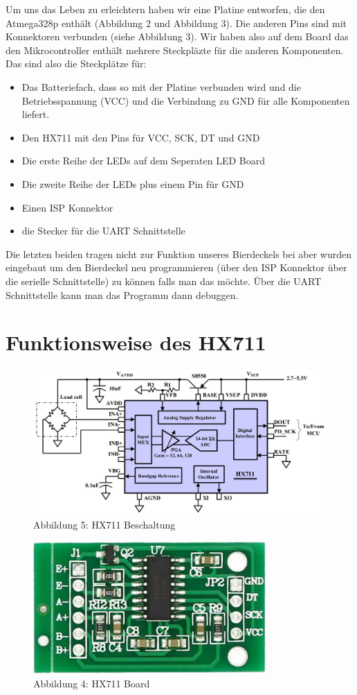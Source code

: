 \documentclass[12pt,journal,compsoc]{IEEEtran}
\begin{document}
Um uns das Leben zu erleichtern haben wir eine Platine entworfen, die den Atmega328p enthält
(Abbildung 2 und Abbildung 3). Die anderen Pins sind mit Konnektoren verbunden (siehe Abbildung 3).
Wir haben also auf dem Board das den Mikrocontroller enthält mehrere Steckpläzte für die anderen
Komponenten. Das sind also die Steckplätze für:
\begin{itemize}
 \item Das Batteriefach, dass so mit der Platine verbunden wird und die Betriebsspannung (VCC) und die Verbindung zu GND für alle Komponenten liefert.
 \item Den HX711 mit den Pins für VCC, SCK, DT und GND
 \item Die erste Reihe der LEDs auf dem Seperaten LED Board
 \item Die zweite Reihe der LEDs plus einem Pin für GND
 \item Einen ISP Konnektor
 \item die Stecker für die UART Schnittstelle
\end{itemize}

Die letzten beiden tragen nicht zur Funktion unseres Bierdeckels bei aber wurden eingebaut um den
Bierdeckel neu programmieren (über den ISP Konnektor über die serielle Schnittstelle) zu können
falls man das möchte. Über die UART Schnittstelle kann man das Programm dann debuggen.

\section{Funktionsweise des HX711}

\begin{figure}[!t]
\centering
\includegraphics[width=7in]{images/HX711.jpg}%
\caption{Abbildung 5: HX711 Beschaltung}
\label{fig_HX711}
\end{figure}

\begin{figure}[!t]
  \centering
    \includegraphics[width=3.5in]{images/HX711Board.jpeg}
    \caption{Abbildung 4: HX711 Board}
  \label{fig_HX711_board}
\end{figure}
\end{document}
